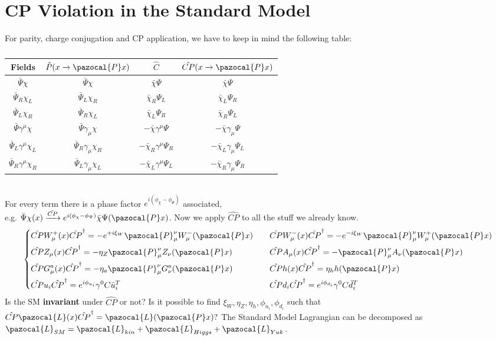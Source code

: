 \documentclass[../main.tex]{subfiles}
\begin{document}
\section{CP Violation in the Standard Model}
For parity, charge conjugation and CP application, we have to keep in mind the following table:
\begin{table}[h]
    \centering
    {\renewcommand{\arraystretch}{1}
    \begin{tabular}{c|c|c|c}
    Fields & $\hat{P}(x\xrightarrow[]{}\pazocal{P}x)$ & $\hat{C}$ & $\hat{CP}(x\xrightarrow[]{}\pazocal{P}x)$\\
    \hline
    $\bar{\Psi}\chi$ & $\bar{\Psi}\chi$ & $\bar{\chi}\Psi$ & $\bar{\chi}\Psi$\\
    $\bar{\Psi}_R\chi_L$ & $\bar{\Psi}_L\chi_R$ & $\bar{\chi}_R\Psi_L$ & $\bar{\chi}_L\Psi_R$\\
    $\bar{\Psi}_L\chi_R$ & $\bar{\Psi}_R\chi_L$ & $\bar{\chi}_L\Psi_R$ & $\bar{\chi}_R\Psi_L$\\
    $\bar{\Psi}\gamma^\mu\chi$ & $\bar{\Psi}\gamma_\mu\chi$ & $-\bar{\chi}\gamma^\mu\Psi$ & $-\bar{\chi}\gamma_\mu\Psi$ \\
    $\bar{\Psi}_L\gamma^\mu\chi_L$ & $\bar{\Psi}_R\gamma_\mu\chi_R$ & $-\bar{\chi}_R\gamma^\mu\Psi_R$ & $-\bar{\chi}_L\gamma_\mu\Psi_L$\\
    $\bar{\Psi}_R\gamma^\mu\chi_R$ & $\bar{\Psi}_L\gamma_\mu\chi_L$ & $-\bar{\chi}_L\gamma^\mu\Psi_L$ & $-\bar{\chi}_R\gamma_\mu\Psi_R$\\
    \hline
    \end{tabular}
    }
    \caption*{}
    \label{tab:my_label}
\end{table}\\
For every term there is a phase factor $e^{i(\phi_\chi-\phi_\Psi)}$ associated,\\
e.g. $\bar{\Psi}\chi(x)\xrightarrow[]{\hat{CP}}e^{i(\phi_\chi-\phi_\Psi)}\bar{\chi}\Psi(\pazocal{P}x)$. Now we apply $\hat{CP}$ to all the stuff we already know.
\[
\left\{
\begin{aligned}
&\hat{CP}W_\mu^+(x)\hat{CP}^\dagger=-e^{+i\xi_W}\pazocal{P}_\mu^\nu W_\mu^-(\pazocal{P}x) \quad &&\hat{CP}W_\mu^-(x)\hat{CP}^\dagger=-e^{-i\xi_W}\pazocal{P}_\mu^\nu W_\mu^+(\pazocal{P}x)\\
&\hat{CP}Z_\mu(x)\hat{CP}^\dagger=-\eta_Z\pazocal{P}_\mu^\nu Z_\nu(\pazocal{P}x) \quad && \hat{CP}A_\mu(x)\hat{CP}^\dagger=-\pazocal{P}_\mu^\nu A_\nu(\pazocal{P}x)\\
&\hat{CP}G_\mu^a(x)\hat{CP}^\dagger=-\eta_a\pazocal{P}_\mu^\nu G_\nu^a(\pazocal{P}x) \quad && \hat{CP}h(x)\hat{CP}^\dagger=\eta_h h(\pazocal{P}x)\\
&\hat{CP}u_i\hat{CP}^\dagger=e^{i\phi_{u_i}}\gamma^0C\bar{u}_i^T \quad && \hat{CP}d_i\hat{CP}^\dagger=e^{i\phi_{d_i}}\gamma^0C\bar{d}_i^T
\end{aligned}
\right.
\]
Is the SM \textbf{invariant} under $\hat{CP}$ or not?  Is it possible to find $\xi_W, \eta_Z, \eta_h, \phi_{u_i}, \phi_{d_i}$ such that $\hat{CP}\pazocal{L}(x)\hat{CP}^\dagger=\pazocal{L}(\pazocal{P}x)?$ The Standard Model Lagrangian can be decomposed as $\pazocal{L}_{SM}=\pazocal{L}_{kin}+\pazocal{L}_{Higgs}+\pazocal{L}_{Yuk}$. 
\end{document}
